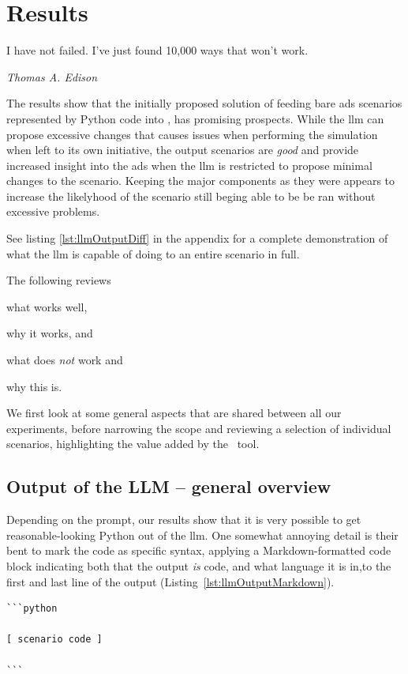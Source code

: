 \chapter{Results}\label{sec:results}

\epigraph{I have not failed. I've just found 10,000 ways that won't work.}{\textit{Thomas A.
        Edison}}

The results show that the initially proposed solution of feeding bare
\acrshort{ads} scenarios represented by Python code into , has promising prospects.
While the \acrshort{llm} can propose excessive changes that causes issues when performing the
simulation when left to its own initiative, the output scenarios are \emph{good} and provide
increased insight into the \acrshort{ads} when the \acrshort{llm} is restricted to propose minimal
changes to the scenario. Keeping the major components as they were appears to increase the
likelyhood of the scenario still beging able to be be ran without excessive problems.

See listing \ref{lst:llmOutputDiff} in the  appendix for a complete
demonstration of what the \acrlong{llm} is capable of doing to an entire scenario in full.

The following reviews \begin{inparaenum}
    \item what works well,
    \item why it works, and
    \item what does \emph{not} work and
    \item why this is.
\end{inparaenum} We first look at some general aspects that are shared between all our experiments, before narrowing
the scope and reviewing a selection of individual scenarios, highlighting the value added by the
\hefe~tool.


\section{Output of the LLM -- general overview}

Depending on the prompt, our results show that it is very possible to get
reasonable-looking Python out of the \acrshort{llm}. One somewhat annoying
detail is their bent to mark the code as specific syntax, applying a Markdown-formatted code block
indicating both that the output \emph{is} code, and what language it is in,to the first and last
line of the output (Listing~\ref{lst:llmOutputMarkdown}).
\begin{lstlisting}[caption={LLM-generated Python code with Markdown syntax. The bracketed part on line 3 has been added for demonstration purposes, removing the actual code for brevity.}, label={lst:llmOutputMarkdown}]
```python

[ scenario code ]

```
\end{lstlisting}

